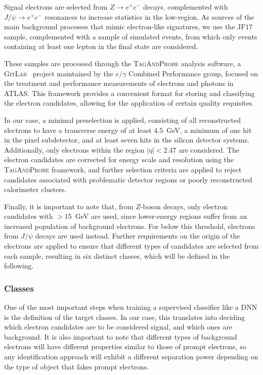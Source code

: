 Signal electrons are selected from $Z \rightarrow e^{+}e^{-}$ decays, complemented with $J/\psi \rightarrow e^{+}e^{-}$ resonances to increase statistics in the low-\et region. As sources of the main background processes that mimic electron-like signatures, we use the $\text{JF}17$ sample, complemented with a sample of simulated \ttbar events, from which only events containing at least one lepton in the final state are considered.

These samples are processed through the \textsc{TagAndProbe} analysis software, a \textsc{GitLab}~\cite{tagandprobe} project maintained by the $e/\gamma$ Combined Performance group, focused on the treatment and performance measurements of electrons and photons in ATLAS. This framework provides a convenient format for storing and classifying the electron candidates, allowing for the application of certain quality requisites.

In our case, a minimal preselection is applied, consisting of all reconstructed electrons to have a transverse energy of at least $4.5$~GeV, a minimum of one hit in the pixel subdetector, and at least seven hits in the silicon detector systems. Additionally, only electrons within the region $|\eta| < 2.47$ are considered. The electron candidates are corrected for energy scale and resolution using the \textsc{TagAndProbe} framework, and further selection criteria are applied to reject candidates associated with problematic detector regions or poorly reconstructed calorimeter clusters.

Finally, it is important to note that, from $Z$-boson decays, only electron candidates with \et$>15$~GeV are used, since lower-energy regions suffer from an increased population of background electrons. For \et below this threshold, electrons from $J/\psi$ decays are used instead. Further requirements on the origin of the electrons are applied to ensure that different types of candidates are selected from each sample, resulting in six distinct classes, which will be defined in the following.

\subsubsection{Classes}

One of the most important steps when training a supervised classifier like a DNN is the definition of the target classes. In our case, this translates into deciding which electron candidates are to be considered signal, and which ones are background. It is also important to note that different types of background electrons will have different properties similar to those of prompt electrons,
so any identification approach will exhibit a different separation power depending on the type of object that fakes prompt electrons.

